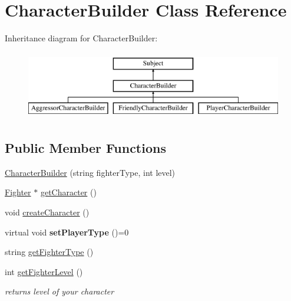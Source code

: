 \hypertarget{class_character_builder}{}\section{Character\+Builder Class Reference}
\label{class_character_builder}
Inheritance diagram for Character\+Builder\+:\begin{figure}[H]
\begin{center}
\leavevmode
\includegraphics[height=3.000000cm]{class_character_builder}
\end{center}
\end{figure}
\subsection*{Public Member Functions}
\begin{DoxyCompactItemize}
\item 
\hyperlink{class_character_builder_ae4e05926be89b82015e95ef98b68aa6e}{Character\+Builder} (string fighter\+Type, int level)
\item 
\hyperlink{class_fighter}{Fighter} $\ast$ \hyperlink{class_character_builder_aef13e6e69fd2d07572daeb2643a3fa34}{get\+Character} ()
\item 
void \hyperlink{class_character_builder_a3565d9c329c959aa340d7c0ebf30e613}{create\+Character} ()
\item 
\hypertarget{class_character_builder_a2d5158a927bf33402393fa99d148bf8a}{}\label{class_character_builder_a2d5158a927bf33402393fa99d148bf8a} 
virtual void {\bfseries set\+Player\+Type} ()=0
\item 
string \hyperlink{class_character_builder_ae7c1c4adb177df591db8ae2c9eae9cb9}{get\+Fighter\+Type} ()
\item 
\hypertarget{class_character_builder_ae9add8be71d78b905d54a62b19d53a47}{}\label{class_character_builder_ae9add8be71d78b905d54a62b19d53a47} 
int \hyperlink{class_character_builder_ae9add8be71d78b905d54a62b19d53a47}{get\+Fighter\+Level} ()
\begin{DoxyCompactList}\small\item\em returns level of your character \end{DoxyCompactList}\end{DoxyCompactItemize}
